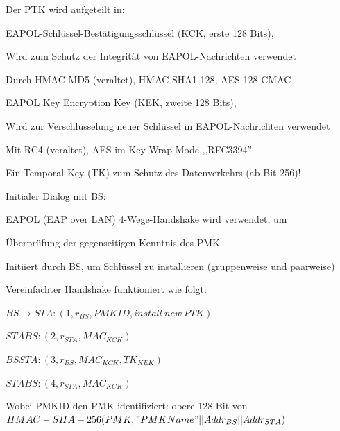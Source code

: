 \documentclass[a4paper]{article}
\begin{document}
\begin{multicols}{3}
\begin{itemize*}
\begin{itemize*}
            \end{itemize*}
            \item Der PTK wird aufgeteilt in:
            \begin{itemize*}
                  \item EAPOL-Schlüssel-Bestätigungsschlüssel (KCK, erste 128 Bits),
                  \begin{itemize*}
                        \item Wird zum Schutz der Integrität von EAPOL-Nachrichten verwendet
                        \item Durch HMAC-MD5 (veraltet), HMAC-SHA1-128, AES-128-CMAC
                  \end{itemize*}
                  \item EAPOL Key Encryption Key (KEK, zweite 128 Bits),
                  \begin{itemize*}
                        \item Wird zur Verschlüsselung neuer Schlüssel in EAPOL-Nachrichten verwendet
                        \item Mit RC4 (veraltet), AES im Key Wrap Mode ,,RFC3394''
                  \end{itemize*}
                  \item Ein Temporal Key (TK) zum Schutz des Datenverkehrs (ab Bit 256)!
            \end{itemize*}
            \item Initialer Dialog mit BS:
            \begin{itemize*}
                  \item EAPOL (EAP over LAN) 4-Wege-Handshake wird verwendet, um
                  \begin{itemize*}
                        \item Überprüfung der gegenseitigen Kenntnis des PMK
                        \item Initiiert durch BS, um Schlüssel zu installieren (gruppenweise und paarweise)
                  \end{itemize*}
                  \item Vereinfachter Handshake funktioniert wie folgt:
                  \begin{enumerate*}
                        \item $BS\rightarrow STA: (1, r_{BS} , PMKID, install\ new\ PTK)$
                        \item $STA BS: (2, r_{STA}, MAC_{KCK})$
                        \item $BS STA: (3, r_{BS}, MAC_{KCK}, {TK}_{KEK})$
                        \item $STA BS: (4, r_{STA}, MAC_{KCK})$
                  \end{enumerate*}
                  \item Wobei PMKID den PMK identifiziert: obere 128 Bit von $HMAC-SHA-256(PMK, "PMK Name" || Addr_{BS} || Addr_{STA} )$
            \end{itemize*}
      \end{itemize*}


\end{multicols}
\end{document}
